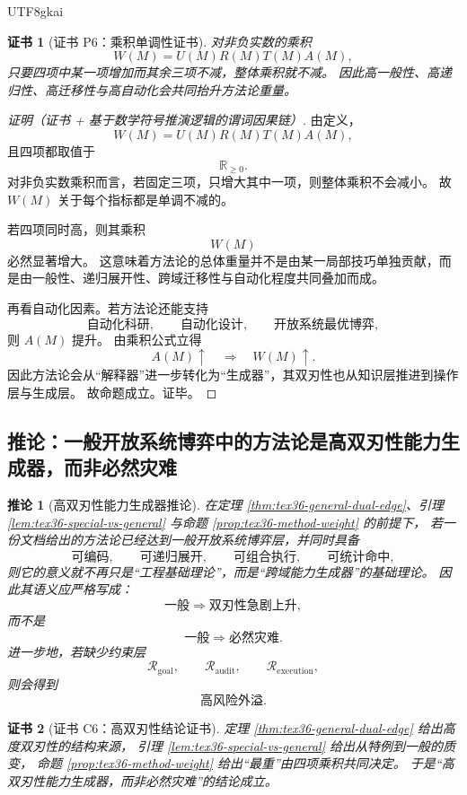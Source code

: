 \documentclass[12pt]{article}
\newtheorem{corollary}{推论}[section]
\newtheorem{Certificate}{证书}[section]
\newcommand{\RR}{\mathbb{R}}
\begin{document}
\begin{CJK*}{UTF8}{gkai}
\begin{Certificate}[证书 P6：乘积单调性证书]
\label{cert:tex36-p6}
对非负实数的乘积
\[
  W(M)=U(M)R(M)T(M)A(M),
\]
只要四项中某一项增加而其余三项不减，整体乘积就不减。
因此高一般性、高递归性、高迁移性与高自动化会共同抬升方法论重量。
\end{Certificate}

\begin{proof}[证明（证书 + 基于数学符号推演逻辑的谓词因果链）]
由定义，
\[
  W(M)=U(M)R(M)T(M)A(M),
\]
且四项都取值于
\[
  \RR_{\ge 0}.
\]
对非负实数乘积而言，若固定三项，只增大其中一项，则整体乘积不会减小。
故 $W(M)$ 关于每个指标都是单调不减的。

若四项同时高，则其乘积
\[
  W(M)
\]
必然显著增大。
这意味着方法论的总体重量并不是由某一局部技巧单独贡献，而是由一般性、递归展开性、跨域迁移性与自动化程度共同叠加而成。

再看自动化因素。若方法论还能支持
\[
  \text{自动化科研},\qquad
  \text{自动化设计},\qquad
  \text{开放系统最优博弈},
\]
则 $A(M)$ 提升。
由乘积公式立得
\[
  A(M)\uparrow
  \quad\Longrightarrow\quad
  W(M)\uparrow.
\]
因此方法论会从“解释器”进一步转化为“生成器”，其双刃性也从知识层推进到操作层与生成层。
故命题成立。证毕。
\end{proof}

\subsection{推论：一般开放系统博弈中的方法论是高双刃性能力生成器，而非必然灾难}
\label{subsec:tex36-general-corollary}

\begin{corollary}[高双刃性能力生成器推论]
\label{cor:tex36-general-generator}
在定理 \ref{thm:tex36-general-dual-edge}、引理 \ref{lem:tex36-special-vs-general} 与命题 \ref{prop:tex36-method-weight} 的前提下，
若一份文档给出的方法论已经达到一般开放系统博弈层，并同时具备
\[
  \text{可编码},\qquad
  \text{可递归展开},\qquad
  \text{可组合执行},\qquad
  \text{可统计命中},
\]
则它的意义就不再只是“工程基础理论”，而是“跨域能力生成器”的基础理论。
因此其语义应严格写成：
\[
  \text{一般}
  \Rightarrow
  \text{双刃性急剧上升},
\]
而不是
\[
  \text{一般}
  \Rightarrow
  \text{必然灾难}.
\]
进一步地，若缺少约束层
\[
  \mathcal R_{\mathrm{goal}},
  \qquad
  \mathcal R_{\mathrm{audit}},
  \qquad
  \mathcal R_{\mathrm{execution}},
\]
则会得到
\[
  \text{高风险外溢}.
\]
\end{corollary}

\begin{Certificate}[证书 C6：高双刃性结论证书]
\label{cert:tex36-c6}
定理 \ref{thm:tex36-general-dual-edge} 给出高度双刃性的结构来源，
引理 \ref{lem:tex36-special-vs-general} 给出从特例到一般的质变，
命题 \ref{prop:tex36-method-weight} 给出“最重”由四项乘积共同决定。
于是“高双刃性能力生成器，而非必然灾难”的结论成立。
\end{Certificate}


\end{CJK*}
\end{document}
